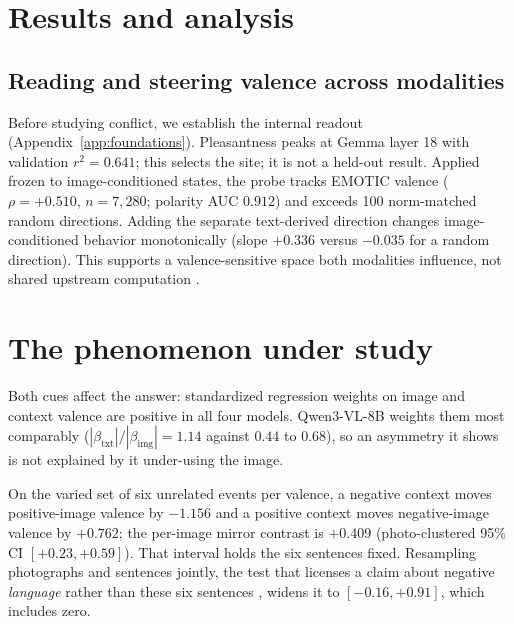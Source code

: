 \documentclass{article}
\newif\ifshort
\newcommand{\qwen}{Qwen3-VL-8B}
\newcommand{\betaimg}{\beta_{\text{img}}}
\newcommand{\betatxt}{\beta_{\text{txt}}}
\begin{document}
\else
\section{Results and analysis}

\subsection{Reading and steering valence across modalities}
\label{sec:foundations}

Before studying conflict, we establish the internal readout (Appendix~\ref{app:foundations}). Pleasantness peaks at Gemma layer 18 with validation $r^2=0.641$; this selects the site; it is not a held-out result. Applied frozen to image-conditioned states, the probe tracks EMOTIC valence ($\rho=+0.510$, $n=7{,}280$; polarity AUC $0.912$) and exceeds 100 norm-matched random directions. Adding the separate text-derived direction changes image-conditioned behavior monotonically (slope $+0.336$ versus $-0.035$ for a random direction). This supports a valence-sensitive space both modalities influence, not shared upstream computation \citep{nikankin2025}.
\fi

\ifshort
\section{The phenomenon under study}
\label{sec:conflict}
\label{sec:integration}
\label{sec:asymmetry}
\label{sec:minimal}

Both cues affect the answer: standardized regression weights on image and context valence are positive in all four models. \qwen{} weights them most comparably ($|\betatxt|/|\betaimg|=1.14$ against $0.44$ to $0.68$), so an asymmetry it shows is not explained by it under-using the image.

On the varied set of six unrelated events per valence, a negative context moves positive-image valence by $-1.156$ and a positive context moves negative-image valence by $+0.762$; the per-image mirror contrast is $+0.409$ (photo-clustered 95\% CI $[+0.23,+0.59]$). That interval holds the six sentences fixed. Resampling photographs and sentences jointly, the test that licenses a claim about negative \emph{language} rather than these six sentences \citep{clark1973, westfall2014}, widens it to $[-0.16,+0.91]$, which includes zero.
\end{document}
